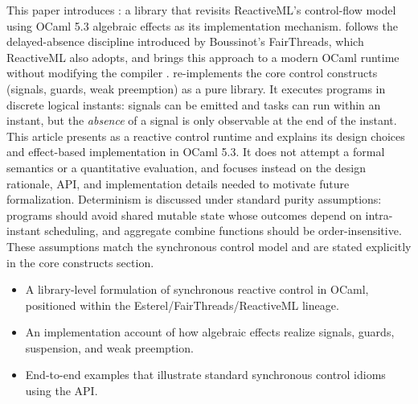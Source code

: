 This paper introduces \tempo{}: a library that revisits ReactiveML's control-flow
model using OCaml 5.3 algebraic effects as its implementation mechanism. \tempo{}
follows the delayed-absence discipline introduced by Boussinot's FairThreads,
which ReactiveML also adopts, and brings this approach to a modern OCaml
runtime without modifying the compiler \cite{fairthreads2003,reactiveml2005}.
\tempo{} re-implements the core control constructs (signals, guards, weak
preemption) as a pure library. It executes programs in discrete logical
instants: signals can be emitted and tasks can run within an instant, but the
\emph{absence} of a signal is only observable at the end of the instant. This
article presents \tempo{} as a reactive control runtime and explains its design
choices and effect-based implementation in OCaml 5.3. It does not attempt a
formal semantics or a quantitative evaluation, and focuses instead on the
design rationale, API, and implementation details needed to motivate future
formalization. Determinism is discussed under standard purity assumptions:
programs should avoid shared mutable state whose outcomes depend on
intra-instant scheduling, and aggregate combine functions should be
order-insensitive. These assumptions match the synchronous control model and
are stated explicitly in the core constructs section.
\begin{itemize}
\item A library-level formulation of synchronous reactive control in OCaml,
  positioned within the Esterel/FairThreads/ReactiveML lineage.
\item An implementation account of how algebraic effects realize signals,
  guards, suspension, and weak preemption.
\item End-to-end examples that illustrate standard synchronous control idioms
  using the \tempo{} API.
\end{itemize}
